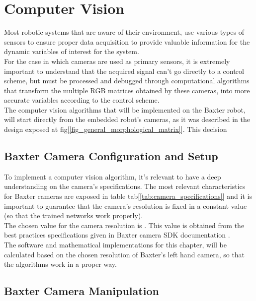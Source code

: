 \documentclass[11pt]{report} %
\begin{document}
\chapter{Computer Vision}

Most robotic systems that are aware of their environment, use various types of sensors to ensure proper data acquisition to provide valuable information for the dynamic variables of interest for the system.\\

For the case in which cameras are used as primary sensors, it is extremely important to understand that the acquired signal can't go directly to a control scheme, but must be processed and debugged through computational algorithms that transform the multiple RGB matrices obtained by these cameras, into more accurate variables according to the control scheme.\\

The computer vision algorithms that will be implemented on the Baxter robot, will start directly from the embedded robot's cameras, as it was described in the design exposed at fig[\ref{fig_general_morphological_matrix}]. This decision

\section{Baxter Camera Configuration and Setup}

To implement a computer vision algorithm, it's relevant to have a deep understanding on the camera's specifications. The most relevant characteristics for Baxter cameras are exposed in table tab[\ref{tab:camera_specifications}] and it is important to guarantee that the camera's resolution is fixed in a constant value (so that the trained networks work properly).\\

The chosen value for the camera resolution is . This value is obtained from the best practices specifications given in Baxter camera SDK documentation \citep{cite_baxter_hardware_specifications}.\\

The software and mathematical implementations for this chapter, will be calculated based on the chosen resolution of Baxter's left hand camera, so that the algorithms work in a proper way.\\

\section{Baxter Camera Manipulation}
\end{document}
